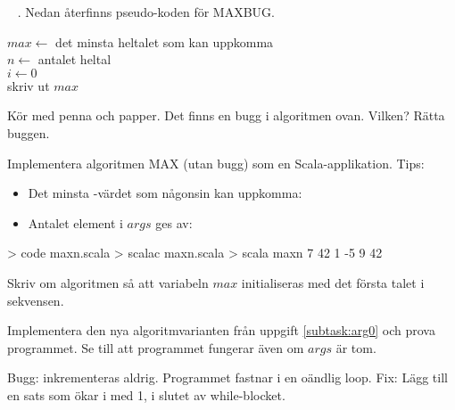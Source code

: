 \QUESTEND



\clearpage

\ExtraTasks %





\QUESTBEGIN

\Task  \what~ . Nedan återfinns pseudo-koden för MAXBUG.

\begin{algorithm}[H]

 $max \leftarrow$ det minsta heltalet som kan uppkomma  \\
 $n \leftarrow $ antalet heltal \\
 $i \leftarrow 0$ \\
 skriv ut $max$
\end{algorithm}

\Subtask Kör med penna och papper. Det finns en bugg i algoritmen ovan. Vilken? Rätta buggen.

\Subtask Implementera algoritmen MAX (utan bugg) som en Scala-applikation. Tips:
\begin{itemize}[noitemsep, nolistsep]
\item Det minsta -värdet som någonsin kan uppkomma: 
\item Antalet element i $args$ ges av: 
\end{itemize}

\begin{REPL}
> code maxn.scala
> scalac maxn.scala
> scala maxn 7 42 1 -5 9
42
\end{REPL}

\Subtask \label{subtask:arg0} Skriv om algoritmen så att variabeln $max$ initialiseras med det första talet i sekvensen.

\Subtask Implementera den nya algoritmvarianten från uppgift \ref{subtask:arg0} och prova programmet. Se till att programmet fungerar även om $args$ är tom.

\SOLUTION


\TaskSolved \what


\SubtaskSolved  Bugg:  inkrementeras aldrig. Programmet fastnar i en oändlig loop. Fix: Lägg till en sats som ökar i med 1, i slutet av while-blocket.

